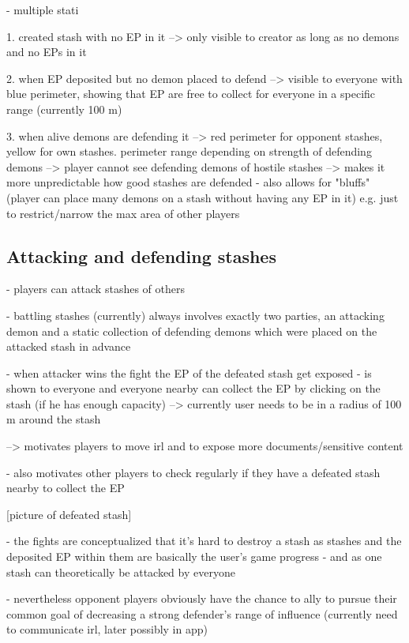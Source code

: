 - multiple stati

1. created stash with no EP in it --> only visible to creator as long as no demons and no EPs in it

2. when EP deposited but no demon placed to defend --> visible to everyone with blue perimeter, showing that EP are free to collect for everyone in a specific range (currently 100 m)

3. when alive demons are defending it --> red perimeter for opponent stashes, yellow for own stashes. perimeter range depending on strength of defending demons
--> player cannot see defending demons of hostile stashes --> makes it more unpredictable how good stashes are defended
- also allows for "bluffs" (player can place many demons on a stash without having any EP in it) e.g. just to restrict/narrow the max area of other players


\subsection{Attacking and defending stashes}
\label{subsec:attackingstashes}

- players can attack stashes of others

- battling stashes (currently) always involves exactly two parties, an attacking demon and a static collection of defending demons which were placed on the attacked stash in advance

- when attacker wins the fight the EP of the defeated stash get exposed 
- is shown to everyone and everyone nearby can collect the EP by clicking on the stash (if he has enough capacity) --> currently user needs to be in a radius of 100 m around the stash 

--> motivates players to move irl and to expose more documents/sensitive content

- also motivates other players to check regularly if they have a defeated stash nearby to collect the EP

[picture of defeated stash]

- the fights are conceptualized that it's hard to destroy a stash as stashes and the deposited EP within them are basically the user's game progress
- and as one stash can theoretically be attacked by everyone

- nevertheless opponent players obviously have the chance to ally to pursue their common goal of decreasing a strong defender's range of influence (currently need to communicate irl, later possibly in app)

